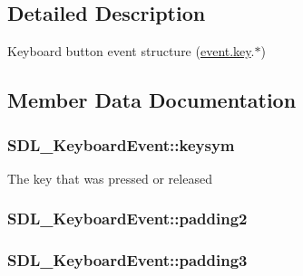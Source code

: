 \subsection{Detailed Description}
Keyboard button event structure (\hyperlink{union_s_d_l___event_ab99927835cc77a9b6bb50b419b4a27df}{event.\+key}.$\ast$) 

\subsection{Member Data Documentation}
\subsubsection[{\texorpdfstring{keysym}{keysym}}]{ S\+D\+L\+\_\+\+Keyboard\+Event\+::keysym}\hypertarget{struct_s_d_l___keyboard_event_a2a57ba820a298f2c02ad5d41fd2b1aa8}{}\label{struct_s_d_l___keyboard_event_a2a57ba820a298f2c02ad5d41fd2b1aa8}
The key that was pressed or released 
\subsubsection[{\texorpdfstring{padding2}{padding2}}]{ S\+D\+L\+\_\+\+Keyboard\+Event\+::padding2}\hypertarget{struct_s_d_l___keyboard_event_ae270122f757f76171318294afd2c95e6}{}\label{struct_s_d_l___keyboard_event_ae270122f757f76171318294afd2c95e6}
\subsubsection[{\texorpdfstring{padding3}{padding3}}]{ S\+D\+L\+\_\+\+Keyboard\+Event\+::padding3}\hypertarget{struct_s_d_l___keyboard_event_ae1831035ef556a7b09efcd2469f26f7a}{}\label{struct_s_d_l___keyboard_event_ae1831035ef556a7b09efcd2469f26f7a}

